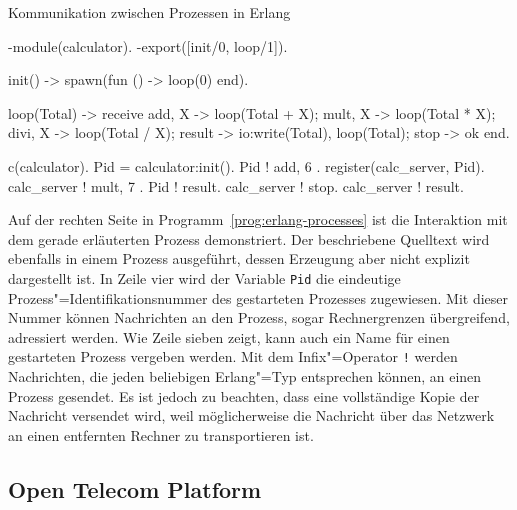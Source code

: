 \begin{program}[!hbt]
\caption{Kommunikation zwischen Prozessen in Erlang}
\label{prog:erlang-processes}
\noindent\begin{minipage}[t]{.52\textwidth}
\lstset{showlines=true}
\begin{ErlangCode}
-module(calculator).
-export([init/0, loop/1]).

init() ->
  spawn(fun () -> loop(0) end).

loop(Total) ->
  receive
    { add,  X } -> loop(Total + X);
    { mult, X } -> loop(Total * X);
		{ divi, X } -> loop(Total / X);
    result      -> io:write(Total),
									 loop(Total);
    stop    		-> ok
  end.
\end{ErlangCode}

\end{minipage}\hfill
\begin{minipage}[t]{.44\textwidth}
\lstset{showlines=true}
\begin{ErlangCode}
c(calculator).
Pid = calculator:init().
Pid ! { add, 6 }.
register(calc_server, Pid).
calc_server ! { mult, 7 }.
Pid ! result. %
calc_server ! stop.
calc_server ! result.
\end{ErlangCode}

\end{minipage}
\end{program}

Auf der rechten Seite in Programm~\ref{prog:erlang-processes} ist die Interaktion mit dem gerade erläuterten Prozess demonstriert. Der beschriebene Quelltext wird ebenfalls in einem Prozess ausgeführt, dessen Erzeugung aber nicht explizit dargestellt ist. In Zeile vier wird der Variable \lstinline{Pid} die eindeutige Prozess"=Identifikationsnummer des gestarteten Prozesses zugewiesen. Mit dieser Nummer können Nachrichten an den Prozess, sogar Rechnergrenzen übergreifend, adressiert werden. Wie Zeile sieben zeigt, kann auch ein Name für einen gestarteten Prozess vergeben werden. Mit dem Infix"=Operator \lstinline{!} werden Nachrichten, die jeden beliebigen Erlang"=Typ entsprechen können, an einen Prozess gesendet. Es ist jedoch zu beachten, dass eine vollständige Kopie der Nachricht versendet wird, weil möglicherweise die Nachricht  über das Netzwerk an einen entfernten Rechner zu transportieren ist.

\subsection{Open Telecom Platform}


